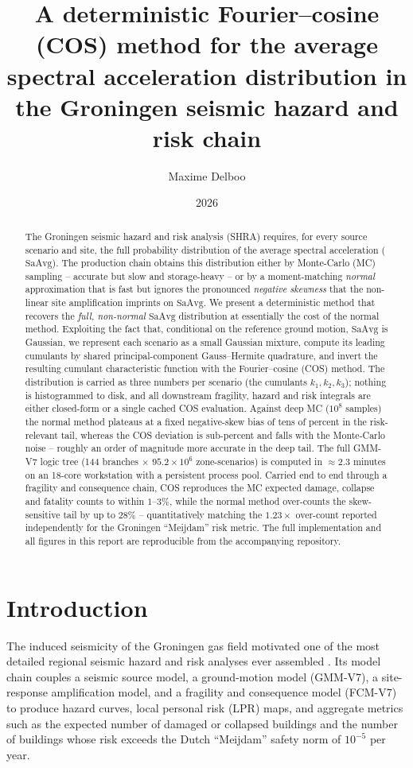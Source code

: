 \documentclass[11pt,a4paper]{article}
\title{\textbf{A deterministic Fourier--cosine (COS) method for the average
spectral acceleration distribution in the Groningen seismic hazard and risk
chain}}
\author{Maxime Delboo}
\date{2026}
\newcommand{\saavg}{\mathrm{SaAvg}}
\begin{document}
\maketitle

\begin{abstract}
\noindent
The Groningen seismic hazard and risk analysis (SHRA) requires, for every
source scenario and site, the full probability distribution of the average
spectral acceleration ($\saavg$). The production chain obtains this distribution
either by Monte-Carlo (MC) sampling -- accurate but slow and storage-heavy -- or
by a moment-matching \emph{normal} approximation that is fast but ignores the
pronounced \emph{negative skewness} that the non-linear site amplification
imprints on $\saavg$. We present a deterministic method that recovers the
\emph{full, non-normal} $\saavg$ distribution at essentially the cost of the
normal method. Exploiting the fact that, conditional on the reference ground
motion, $\saavg$ is Gaussian, we represent each scenario as a small Gaussian
mixture, compute its leading cumulants by shared principal-component
Gauss--Hermite quadrature, and invert the resulting cumulant characteristic
function with the Fourier--cosine (COS) method. The distribution is carried as
three numbers per scenario (the cumulants $k_1,k_2,k_3$); nothing is
histogrammed to disk, and all downstream fragility, hazard and risk integrals are
either closed-form or a single cached COS evaluation. Against deep MC
($10^8$ samples) the normal method plateaus at a fixed negative-skew bias of tens
of percent in the risk-relevant tail, whereas the COS deviation is sub-percent and
falls with the Monte-Carlo noise -- roughly an order of magnitude more accurate in
the deep tail. The full GMM-V7 logic tree (144 branches $\times$
$95.2\times10^6$ zone-scenarios) is computed in $\mathbf{\approx2.3}$ minutes on an
18-core workstation with a persistent process pool. Carried end to end through a
fragility and consequence chain, COS reproduces the MC expected damage,
collapse and fatality counts to within $1$--$3\%$, while the normal method
over-counts the skew-sensitive tail by up to $28\%$ -- quantitatively matching
the $1.23\times$ over-count reported independently for the Groningen ``Meijdam''
risk metric. The full implementation and all figures in this report are
reproducible from the accompanying repository.
\end{abstract}

\section{Introduction}
The induced seismicity of the Groningen gas field motivated one of the most
detailed regional seismic hazard and risk analyses ever assembled
\cite{groningenSHRA}. Its model chain couples a seismic source model, a
ground-motion model (GMM-V7), a site-response amplification model, and a
fragility and consequence model (FCM-V7) to produce hazard curves, local
personal risk (LPR) maps, and aggregate metrics such as the expected number of
damaged or collapsed buildings and the number of buildings whose risk exceeds the
Dutch ``Meijdam'' safety norm of $10^{-5}$ per year.
\end{document}
